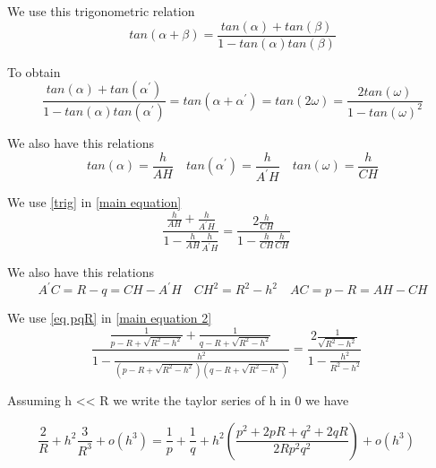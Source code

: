 \documentclass{article}
\begin{document}
We use this trigonometric relation
\begin{equation}
    tan(\alpha + \beta) = \frac{tan(\alpha)+tan(\beta)}{1-tan(\alpha)tan(\beta)}  
\end{equation}

To obtain
\begin{equation}
    \frac{tan(\alpha)+tan(\alpha^{\prime})}{1-tan(\alpha)tan(\alpha^{\prime})} =  tan(\alpha + \alpha^{\prime}) = tan(2 \omega) = \frac{2tan(\omega)}{1-tan(\omega)^2} 
    \label{main equation}
\end{equation}

We also have this relations
\begin{equation}
    tan(\alpha) = \frac{h}{AH} \quad 
    tan(\alpha^{\prime}) = \frac{h}{A^{\prime}H} \quad 
    tan(\omega) = \frac{h}{CH}  
    \label{trig}
\end{equation}

We use \eqref{trig} in \eqref{main equation}
\begin{equation}
    \frac{ \frac{h}{AH} +  \frac{h}{A^{\prime}H} }{1- \frac{h}{AH}\frac{h}{A^{\prime}H} } = \frac{2 \frac{h}{CH} }{1- \frac{h}{CH}\frac{h}{CH}}   \quad   
    \label{main equation 2}
\end{equation}

We also have this relations 
\begin{equation}
   A^{\prime}C = R - q = CH - A^{\prime}H \quad
    CH^2 = R^2-h^2 \quad 
    AC = p - R = AH - CH  
    \label{eq pqR}
\end{equation}

We use \eqref{eq pqR} in \eqref{main equation 2}
\begin{equation}
    \frac{ \frac{1}{p-R + \sqrt{R^2-h^2}} +  \frac{1}{q-R + \sqrt{R^2-h^2}}}{1- \frac{h^2}{(p-R + \sqrt{R^2-h^2})(q-R + \sqrt{R^2-h^2})} } = \frac{2 \frac{1}{\sqrt{R^2-h^2}} }{1- \frac{h^2}{R^2-h^2}}   \quad   
\end{equation}

Assuming h << R we write the taylor series of h in 0 we have 

\begin{equation}
    \frac{ 2}{R} + h^2\frac{3}{R^3} + o(h^3) = \frac{1}{p} + \frac{1}{q} + h^2 ( \frac{p^2 + 2pR + q^2 + 2qR}{2Rp^2q^2} ) + o(h^3)   \quad   
\end{equation}
\end{document}
